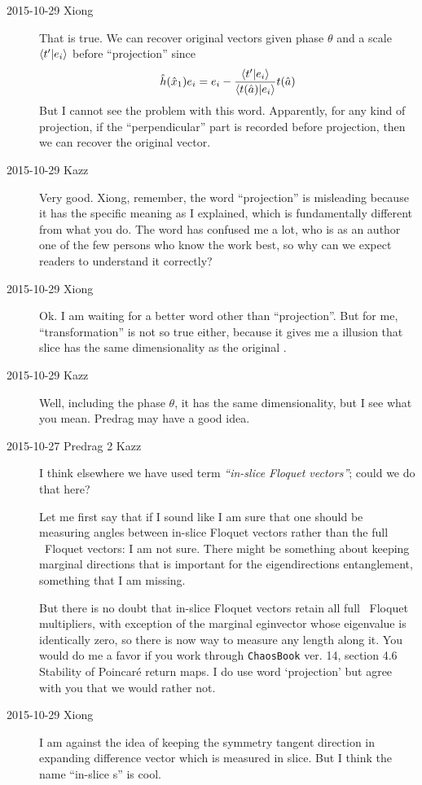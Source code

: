\begin{description}
\item[2015-10-29 Xiong]
That is true. We can recover original vectors given phase $\theta$ and
a scale $\braket{t'}{e_i}$ before ``projection'' since
\[
  \hat{h}(\hat{x}_1)e_i = e_i -
  \frac{\braket{t'}{e_i}}{\braket{t(\sspRed)}{e_i}} t(\sspRed)
\]
But I cannot see the problem with this word. Apparently,
for any kind of projection, if the
``perpendicular'' part is recorded before projection, then we
can recover the original vector.

\item[2015-10-29 Kazz]
Very good. Xiong, remember, the word ``projection'' is misleading because
it has the specific meaning as I explained, which is fundamentally
different from what you do. The word has confused me a lot, who is as an
author one of the few persons who know the work best, so why can we
expect readers to understand it correctly?

\item[2015-10-29 Xiong]
Ok. I am waiting for a better word other than ``projection''. But for me,
``transformation'' is not so true either, because it gives me a illusion
that slice has the same dimensionality as the original \statesp.

\item[2015-10-29 Kazz]
Well, including the phase $\theta$, it has the same dimensionality, but I see what you mean. Predrag may have a good idea.

\item[2015-10-27 Predrag 2 Kazz]
I think elsewhere we have used term \emph{``in-slice Floquet vectors''};
could we do that here?

Let me first say that if I sound like I am sure that one should be
measuring angles between in-slice Floquet vectors rather than the full
\statesp\ Floquet vectors: I am not sure. There might be something about
keeping marginal directions that is important for the eigendirections
entanglement, something that I am missing.

But there is no doubt that in-slice Floquet vectors retain all full
\statesp\ Floquet multipliers, with exception of the marginal eginvector
whose eigenvalue is identically zero, so there is now way to measure any
length along it. You would do me a favor if you work through \texttt{ChaosBook}
ver. 14, section
{4.6 Stability of Poincar\'e return maps}.
I do use word `projection' but agree with you that we would rather not.

\item[2015-10-29 Xiong]
I am against the idea of keeping the symmetry tangent direction in
expanding difference vector which is measured in slice. But I think the
name ``in-slice \Fv s'' is cool.


\end{description}
